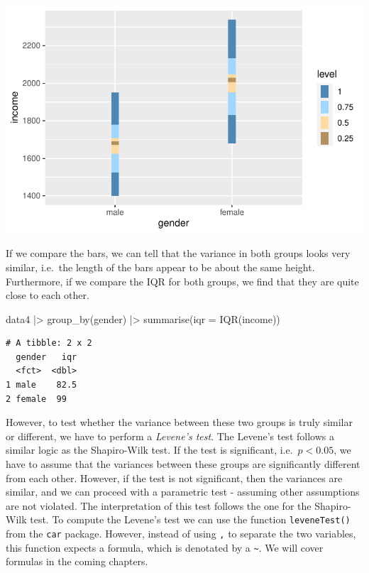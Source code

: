 \documentclass[
  letterpaper,
]{krantz}
\makeatletter
\newenvironment{Shaded}{\begin{snugshade}}{\end{snugshade}}
\newcommand{\AttributeTok}[1]{\textcolor[rgb]{0.40,0.45,0.13}{#1}}
\newcommand{\FunctionTok}[1]{\textcolor[rgb]{0.28,0.35,0.67}{#1}}
\newcommand{\NormalTok}[1]{\textcolor[rgb]{0.00,0.23,0.31}{#1}}
\newcommand{\SpecialCharTok}[1]{\textcolor[rgb]{0.37,0.37,0.37}{#1}}
\newenvironment{kframe}{%
\medskip{}
\setlength{\fboxsep}{.8em}
 \def\at@end@of@kframe{}%
 \ifinner\ifhmode%
  \def\at@end@of@kframe{\end{minipage}}%
  \begin{minipage}{\columnwidth}%
 \fi\fi%
 \def\FrameCommand##1{\hskip\@totalleftmargin \hskip-\fboxsep
 \colorbox{shadecolor}{##1}\hskip-\fboxsep
     \hskip-\linewidth \hskip-\@totalleftmargin \hskip\columnwidth}%
 \MakeFramed {\advance\hsize-\width
   \@totalleftmargin\z@ \linewidth\hsize
   \@setminipage}}%
 {\par\unskip\endMakeFramed%
 \at@end@of@kframe}
\renewenvironment{Shaded}{\begin{kframe}}{\end{kframe}}
\makeatother
\begin{document}
\includegraphics{09_sources_of_bias_files/figure-pdf/homogeneity-variance-alt-vis-1.pdf}

If we compare the bars, we can tell that the variance in both groups
looks very similar, i.e.~the length of the bars appear to be about the
same height. Furthermore, if we compare the IQR for both groups, we find
that they are quite close to each other.

\begin{Shaded}
\begin{Highlighting}[]
\NormalTok{data4 }\SpecialCharTok{|\textgreater{}}
  \FunctionTok{group\_by}\NormalTok{(gender) }\SpecialCharTok{|\textgreater{}}
  \FunctionTok{summarise}\NormalTok{(}\AttributeTok{iqr =} \FunctionTok{IQR}\NormalTok{(income))}
\end{Highlighting}
\end{Shaded}

\begin{verbatim}
# A tibble: 2 x 2
  gender   iqr
  <fct>  <dbl>
1 male    82.5
2 female  99  
\end{verbatim}

However, to test whether the variance between these two groups is truly
similar or different, we have to perform a \emph{Levene's test}. The
Levene's test follows a similar logic as the Shapiro-Wilk test. If the
test is significant, i.e.~\(p < 0.05\), we have to assume that the
variances between these groups are significantly different from each
other. However, if the test is not significant, then the variances are
similar, and we can proceed with a parametric test - assuming other
assumptions are not violated. The interpretation of this test follows
the one for the Shapiro-Wilk test. To compute the Levene's test we can
use the function \texttt{leveneTest()} from the \texttt{car} package.
However, instead of using \texttt{,} to separate the two variables, this
function expects a formula, which is denotated by a
\texttt{\textasciitilde{}}. We will cover formulas in the coming
chapters.
\end{document}
